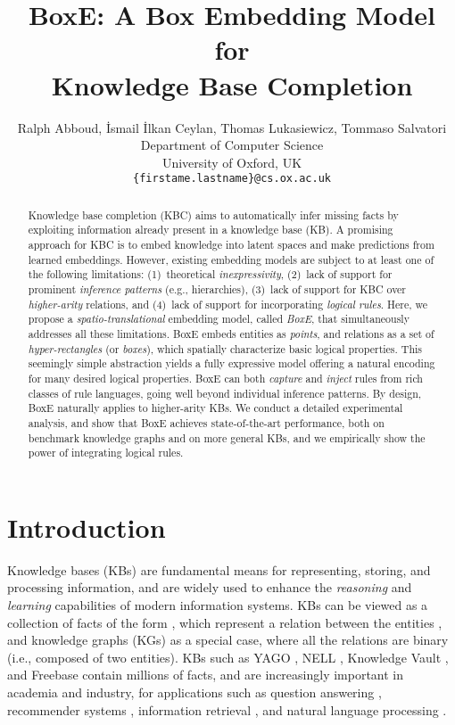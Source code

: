 \documentclass{article}
\title{BoxE: A Box Embedding Model for\\ Knowledge Base Completion}
\author{Ralph Abboud, {\.I}smail {\.I}lkan Ceylan, Thomas Lukasiewicz, Tommaso Salvatori \\
  Department of Computer Science\\
  University of Oxford, UK\\
  \texttt{\{firstame.lastname\}@cs.ox.ac.uk} \\
}
\begin{document}
\maketitle

\begin{abstract}
Knowledge base completion (KBC) aims to automatically infer missing facts by exploiting information already present in a knowledge base (KB). A promising approach for KBC is to embed knowledge into latent spaces and make predictions from learned embeddings.
However, existing embedding models are subject to at least one of the following limitations: (1)~theoretical \emph{inexpressivity}, (2)~lack of support for prominent \emph{inference patterns} (e.g., hierarchies), (3)~lack of support for KBC over \emph{higher-arity} relations, and (4)~lack of support for incorporating \emph{logical rules}. 
Here, we propose  a \emph{spatio-translational} embedding model, 
called \emph{BoxE}, that simultaneously addresses  all these limitations. BoxE embeds entities as \emph{points}, and relations as a set of \emph{hyper-rectangles} (or \emph{boxes}), which spatially characterize basic logical properties. 
This seemingly simple abstraction yields a fully expressive model offering a natural encoding for many desired logical properties. BoxE can both \emph{capture} and \emph{inject} rules from rich classes  of rule languages, going well beyond individual inference patterns. 
By design, BoxE naturally applies to higher-arity KBs. 
We conduct a detailed experimental analysis, and show that BoxE achieves state-of-the-art performance, both on benchmark knowledge graphs and on more general KBs, and we empirically show the power of integrating logical rules. 
\end{abstract}
\section{Introduction}

Knowledge bases (KBs) are fundamental means for {representing}, {storing}, and {processing} information, and are widely used to enhance the \emph{reasoning} and \emph{learning} capabilities of modern information systems.
KBs can be viewed as a collection of facts of the form , which represent a relation  between the entities , and {knowledge graphs (KGs)} as a special case, where all the relations are binary (i.e., composed of two entities).
KBs such as YAGO \cite{MahdisoltaniBS15}, NELL \cite{MitchellBCM18}, Knowledge Vault \cite{GoogleVault}, and Freebase \cite{BollackerCT07} contain millions of facts, and are increasingly important in academia and industry, for applications such as question answering \cite{BordesCW14}, recommender systems \cite{WangZWZLXG18}, information retrieval \cite{XiongPC17}, and natural language processing \cite{YangM17}. 
\end{document}
